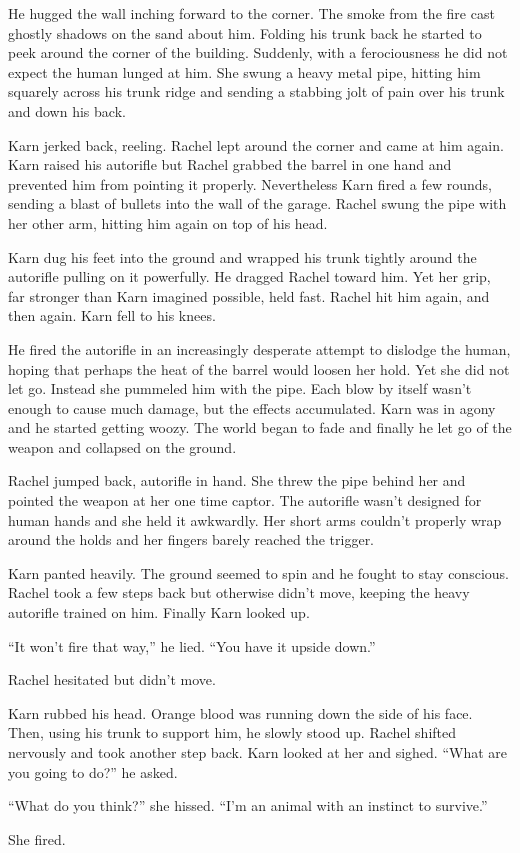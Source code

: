 He hugged the wall inching forward to the corner. The smoke from the fire cast ghostly shadows
on the sand about him. Folding his trunk back he started to peek around the corner of the
building. Suddenly, with a ferociousness he did not expect the human lunged at him. She swung a
heavy metal pipe, hitting him squarely across his trunk ridge and sending a stabbing jolt of
pain over his trunk and down his back.

Karn jerked back, reeling. Rachel lept around the corner and came at him again. Karn raised his
autorifle but Rachel grabbed the barrel in one hand and prevented him from pointing it properly.
Nevertheless Karn fired a few rounds, sending a blast of bullets into the wall of the garage.
Rachel swung the pipe with her other arm, hitting him again on top of his head.

Karn dug his feet into the ground and wrapped his trunk tightly around the autorifle pulling on
it powerfully. He dragged Rachel toward him. Yet her grip, far stronger than Karn imagined
possible, held fast. Rachel hit him again, and then again. Karn fell to his knees.

He fired the autorifle in an increasingly desperate attempt to dislodge the human, hoping that
perhaps the heat of the barrel would loosen her hold. Yet she did not let go. Instead she
pummeled him with the pipe. Each blow by itself wasn't enough to cause much damage, but the
effects accumulated. Karn was in agony and he started getting woozy. The world began to fade and
finally he let go of the weapon and collapsed on the ground.

Rachel jumped back, autorifle in hand. She threw the pipe behind her and pointed the weapon at
her one time captor. The autorifle wasn't designed for human hands and she held it awkwardly.
Her short arms couldn't properly wrap around the holds and her fingers barely reached the
trigger.

Karn panted heavily. The ground seemed to spin and he fought to stay conscious. Rachel took a
few steps back but otherwise didn't move, keeping the heavy autorifle trained on him. Finally
Karn looked up.

``It won't fire that way,'' he lied. ``You have it upside down.''

Rachel hesitated but didn't move.

Karn rubbed his head. Orange blood was running down the side of his face. Then, using his trunk
to support him, he slowly stood up. Rachel shifted nervously and took another step back. Karn
looked at her and sighed. ``What are you going to do?'' he asked.

``What do you think?'' she hissed. ``I'm an animal with an instinct to survive.''

She fired.
